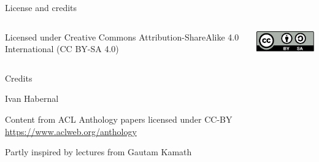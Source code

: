 \documentclass[12pt,aspectratio=169,handout]{beamer}
\begin{document}
\begin{frame}{License and credits}

	\begin{columns}
		\begin{column}{0.7\textwidth}
			Licensed under Creative Commons Attribution-ShareAlike 4.0 International (CC BY-SA 4.0)
		\end{column}
		\begin{column}{0.2\textwidth}
			\includegraphics[width=0.9\linewidth]{img/cc-by-sa-icon.pdf}
		\end{column}
	\end{columns}
	
	\bigskip
	
	Credits
	
	\begin{scriptsize}
		
		Ivan Habernal
		
		Content from ACL Anthology papers licensed under CC-BY \url{https://www.aclweb.org/anthology}
		
		Partly inspired by lectures from Gautam Kamath
	
	\end{scriptsize}
	
\end{frame}
\end{document}
